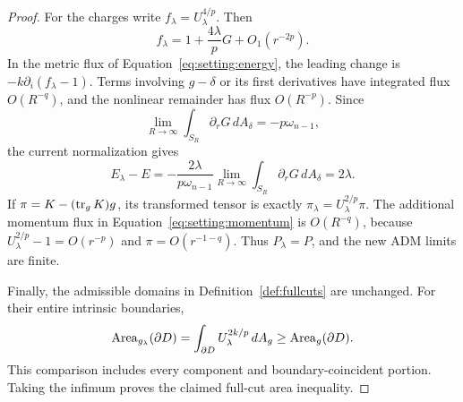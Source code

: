 \begin{proof}
For the charges write $f_\lambda=U_\lambda^{4/p}$. Then
\[
 f_\lambda=1+\frac{4\lambda}{p}G+O_1(r^{-2p}).
\]
In the metric flux of Equation~\eqref{eq:setting:energy}, the leading
change is $-k\partial_i(f_\lambda-1)$. Terms involving $g-\delta$ or
its first derivatives have integrated flux $O(R^{-q})$, and the nonlinear
remainder has flux $O(R^{-p})$. Since
\[
 \lim_{R\to\infty}\int_{S_R}\partial_rG\,dA_\delta
 =-p\omega_{n-1},
\]
the current normalization gives
\[
 E_\lambda-E
 =-\frac{2\lambda}{p\omega_{n-1}}
   \lim_{R\to\infty}\int_{S_R}\partial_rG\,dA_\delta
 =2\lambda.
\]
If $\pi=K-(\operatorname{tr}_gK)g$, its transformed tensor is exactly
$\pi_\lambda=U_\lambda^{2/p}\pi$. The additional momentum flux in
Equation~\eqref{eq:setting:momentum} is $O(R^{-q})$, because
$U_\lambda^{2/p}-1=O(r^{-p})$ and $\pi=O(r^{-1-q})$.
Thus $P_\lambda=P$, and the new ADM limits are finite.

Finally, the admissible domains in Definition~\ref{def:fullcuts} are
unchanged. For their entire intrinsic boundaries,
\[
 \operatorname{Area}_{g_\lambda}(\partial D)
 =\int_{\partial D}U_\lambda^{2k/p}\,dA_g
 \ge \operatorname{Area}_g(\partial D).
\]
This comparison includes every component and boundary-coincident portion.
Taking the infimum proves the claimed full-cut area inequality.
\end{proof}

